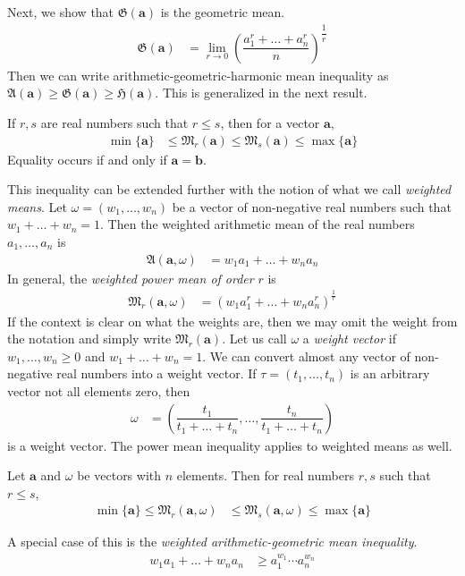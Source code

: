 \documentclass{subfile}
\begin{document}
	Next, we show that $\mathfrak{G}(\mathbf{a})$ is the geometric mean.
		\begin{align*}
			\mathfrak{G}(\mathbf{a})
				& = \lim\limits_{r\to0}\left(\dfrac{a_{1}^{r}+\ldots+a_{n}^{r}}{n}\right)^{\dfrac{1}{r}}
		\end{align*}
	Then we can write arithmetic-geometric-harmonic mean inequality as $\mathfrak{A}(\mathbf{a})\geq\mathfrak{G}(\mathbf{a})\geq \mathfrak{H}(\mathbf{a})$. This is generalized in the next result.
		\begin{theorem}
			If $r,s$ are real numbers such that $r\leq s$, then for a vector $\mathbf{a}$,
				\begin{align*}
					\min\{\mathbf{a}\}
						& \leq \mathfrak{M}_{r}(\mathbf{a})\leq \mathfrak{M}_{s}(\mathbf{a})\leq\max\{\mathbf{a}\}
				\end{align*}
			Equality occurs if and only if $\mathbf{a}=\mathbf{b}$.
		\end{theorem}
	This inequality can be extended further with the notion of what we call \textit{weighted means}. Let $\omega=(w_{1},\ldots,w_{n})$ be a vector of non-negative real numbers such that $w_{1}+\ldots+w_{n}=1$. Then the weighted arithmetic mean of the real numbers $a_{1},\ldots,a_{n}$ is
		\begin{align*}
			\mathfrak{A}(\mathbf{a},\omega)
				& = w_{1}a_{1}+\ldots+w_{n}a_{n}
		\end{align*}
	In general, the \textit{weighted power mean of order} $r$ is
		\begin{align*}
			\mathfrak{M}_{r}(\mathbf{a},\omega)
				& = \left(w_{1}a_{1}^{r}+\ldots+w_{n}a_{n}^{r}\right)^{\frac{1}{r}}
		\end{align*}
	If the context is clear on what the weights are, then we may omit the weight from the notation and simply write $\mathfrak{M}_{r}(\mathbf{a})$. Let us call $\omega$ a \textit{weight vector} if $w_{1},\ldots,w_{n}\geq 0$ and $w_{1}+\ldots+w_{n}=1$. We can convert almost any vector of non-negative real numbers into a weight vector. If $\tau=(t_{1},\ldots,t_{n})$ is an arbitrary vector not all elements zero, then
		\begin{align*}
			\omega
				& = \left(\dfrac{t_{1}}{t_{1}+\ldots+t_{n}},\ldots,\dfrac{t_{n}}{t_{1}+\ldots+t_{n}}\right)
		\end{align*}
	is a weight vector. The power mean inequality applies to weighted means as well.
		\begin{theorem}\label{thm:weightedpowermean}
			Let $\mathbf{a}$ and $\omega$ be vectors with $n$ elements. Then for real numbers $r,s$ such that $r\leq s$,
				\begin{align*}
					\min\{\mathbf{a}\} \leq \mathfrak{M}_{r}(\mathbf{a},\omega)
						& \leq \mathfrak{M}_{s}(\mathbf{a},\omega)\leq \max\{\mathbf{a}\}
				\end{align*}
		\end{theorem}
	A special case of this is the \textit{weighted arithmetic-geometric mean inequality}.
		\begin{align}
			w_{1}a_{1}+\ldots+w_{n}a_{n}
				& \geq a_{1}^{w_{1}}\cdots a_{n}^{w_{n}}\label{eqn:weightedamgm}
		\end{align}
\end{document}
